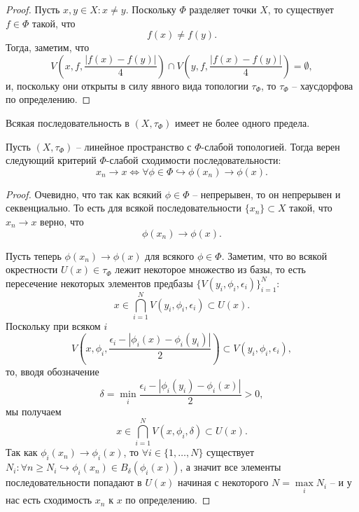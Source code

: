 \begin{proof}
    Пусть $x, y \in X\colon x \neq y$.
    Поскольку $\Phi$ разделяет точки $X$, то существует $f \in \Phi$ такой, что
    \[
        f(x) \neq f(y).
    \]
    Тогда, заметим, что
    \[
        V\left(x, f, \frac{|f(x) - f(y)|}{4}\right) \cap V\left(y, f, \frac{|f(x) - f(y)|}{4}\right) = \emptyset,
    \]
    и, поскольку они открыты в силу явного вида топологии $\tau_\Phi$, то $\tau_\Phi$ -- хаусдорфова по определению.
\end{proof}
\begin{corollary}
    Всякая последовательность в $(X, \tau_\Phi)$ имеет не более одного предела.
\end{corollary}
\begin{proposition}
    Пусть $(X, \tau_\Phi)$ -- линейное пространство с $\Phi$-слабой топологией.
    Тогда верен следующий критерий $\Phi$-слабой сходимости последовательности:
    \[
        x_n \rightarrow x \Longleftrightarrow \forall \phi \in \Phi \hookrightarrow \phi(x_n) \rightarrow \phi(x).
    \]
\end{proposition}
\begin{proof}
    Очевидно, что так как всякий $\phi \in \Phi$ -- непрерывен, то он непрерывен и секвенциально.
    То есть для всякой последовательности $\{x_n\} \subset X$ такой, что $x_n \rightarrow x$ верно, что
    \[
        \phi(x_n) \rightarrow \phi(x).
    \]

    Пусть теперь $\phi(x_n) \rightarrow \phi(x)$ для всякого $\phi \in \Phi$.
    Заметим, что во всякой окрестности $U(x) \in \tau_\Phi$ лежит некоторое множество из базы, то есть пересечение некоторых элементов предбазы $\{V(y_i, \phi_i, \epsilon_i)\}_{i = 1}^{N}\colon$
    \[
        x \in \bigcap_{i = 1}^{N} V(y_i, \phi_i, \epsilon_i) \subset U(x).
    \]
    Поскольку при всяком $i$
    \[
        V\left(x, \phi_i, \frac{\epsilon_i - |\phi_i(x) - \phi_i(y_i)|}{2}\right) \subset V(y_i, \phi_i, \epsilon_i),
    \]
    то, вводя обозначение
    \[\delta = \min\limits_{i} \frac{\epsilon_i - |\phi_i(y_i) - \phi_i(x)|}{2} > 0,\]
    мы получаем
    \[
        x \in \bigcap_{i = 1}^{N} V(x, \phi_i, \delta) \subset U(x).
    \]
    Так как $\phi_i(x_n) \rightarrow \phi_i(x)$, то $\forall i \in \{1, \ldots,  N\}$ существует $N_i\colon \forall n \geq N_{i}\hookrightarrow \phi_i(x_n) \in B_\delta(\phi_i(x))$, а значит все элементы последовательности попадают в $U(x)$ начиная с некоторого $N = \max\limits_{i} N_i$ -- и у нас есть сходимость $x_n$ к $x$ по определению.
\end{proof}
